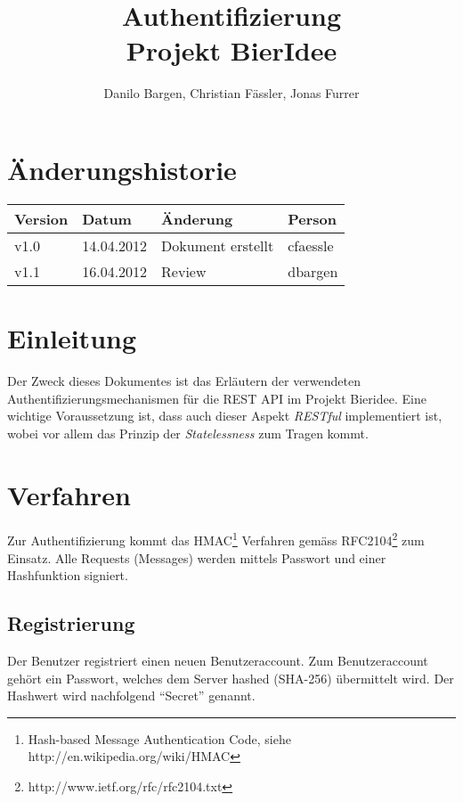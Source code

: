 \documentclass[10pt,a4paper]{scrartcl}
\author{Danilo Bargen, Christian Fässler, Jonas Furrer}
\title{Authentifizierung\\ Projekt BierIdee}
\begin{document}
\begin{titlepage}
	\maketitle
	\vspace{120mm}
	\thispagestyle{empty} %
\end{titlepage}

\tableofcontents
\newpage

\section*{Änderungshistorie}
\begin{tabular}{p{}p{}p{}p{}}
\toprule
\textbf{Version} & \textbf{Datum} & \textbf{Änderung} & \textbf{Person} \\  
\midrule
v1.0 & 14.04.2012 & Dokument erstellt & cfaessle \\  
\hline 
v1.1 & 16.04.2012 & Review & dbargen \\
\bottomrule
\end{tabular} 
\newpage


\section{Einleitung}
Der Zweck dieses Dokumentes ist das Erläutern der verwendeten Authentifizierungsmechanismen für die
REST API im Projekt Bieridee. Eine wichtige Voraussetzung ist, dass auch dieser Aspekt
\textit{RESTful} implementiert ist, wobei vor allem das Prinzip der \textit{Statelessness} zum
Tragen kommt.


\section{Verfahren}
Zur Authentifizierung kommt das HMAC\footnote{Hash-based Message Authentication Code, siehe
http://en.wikipedia.org/wiki/HMAC} Verfahren gemäss
RFC2104\footnote{http://www.ietf.org/rfc/rfc2104.txt} zum Einsatz. Alle Requests (Messages) werden
mittels Passwort und einer Hashfunktion signiert.

\subsection{Registrierung}
Der Benutzer registriert einen neuen Benutzeraccount.
Zum Benutzeraccount gehört ein Passwort, welches dem Server hashed (SHA-256) übermittelt wird.
Der Hashwert wird nachfolgend "`Secret"' genannt. 
\end{document}
